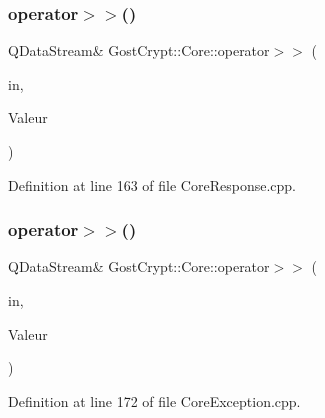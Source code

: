 \mbox{\label{namespace_gost_crypt_1_1_core_a94e510b6aff526804cc4fceba10f7157}} 
\subsubsection{\texorpdfstring{operator$>$$>$()}{operator>>()}\hspace{0.1cm}{\footnotesize\ttfamily [26/56]}}
{\footnotesize\ttfamily Q\+Data\+Stream\& Gost\+Crypt\+::\+Core\+::operator$>$$>$ (\begin{DoxyParamCaption}\item[{Q\+Data\+Stream \&}]{in,  }\item[{\hyperlink{struct_gost_crypt_1_1_core_1_1_get_encryption_algorithms_response}{Get\+Encryption\+Algorithms\+Response} \&}]{Valeur }\end{DoxyParamCaption})}



Definition at line 163 of file Core\+Response.\+cpp.

\mbox{\label{namespace_gost_crypt_1_1_core_a9e66c674336c43a28262f234a5d11817}} 
\subsubsection{\texorpdfstring{operator$>$$>$()}{operator>>()}\hspace{0.1cm}{\footnotesize\ttfamily [27/56]}}
{\footnotesize\ttfamily Q\+Data\+Stream\& Gost\+Crypt\+::\+Core\+::operator$>$$>$ (\begin{DoxyParamCaption}\item[{Q\+Data\+Stream \&}]{in,  }\item[{\hyperlink{class_gost_crypt_1_1_core_1_1_failed_attach_loop_device}{Gost\+Crypt\+::\+Core\+::\+Failed\+Attach\+Loop\+Device} \&}]{Valeur }\end{DoxyParamCaption})}



Definition at line 172 of file Core\+Exception.\+cpp.

\mbox{\label{namespace_gost_crypt_1_1_core_a9b6ac650aa7438569a2c03b9202c14c6}} 
